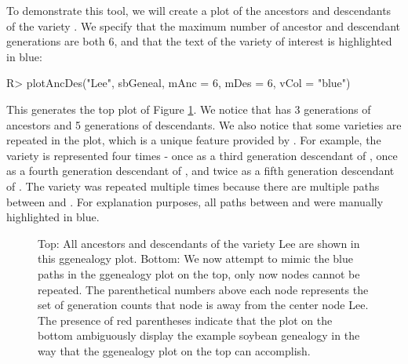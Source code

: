 \documentclass[article,shortnames]{jss}
\begin{document}
To demonstrate this tool, we will create a plot of the ancestors and descendants of the variety . We specify that the maximum number of ancestor and descendant generations are both 6, and that the text of the variety of interest is highlighted in blue:

\begin{Code}
R> plotAncDes("Lee", sbGeneal, mAnc = 6, mDes = 6, vCol = "blue")
\end{Code}

This generates the top plot of Figure \ref{fig:Lee}. We notice that  has 3 generations of ancestors and 5 generations of descendants. We also notice that some varieties are repeated in the plot, which is a unique feature provided by . For example, the variety  is represented four times - once as a third generation descendant of , once as a fourth generation descendant of , and twice as a fifth generation descendant of . The variety  was repeated multiple times because there are multiple paths between  and . For explanation purposes, all paths between  and  were manually highlighted in blue.

\begin{figure}[H]
    \centering
    \caption{Top: All ancestors and descendants of the variety Lee are shown in this ggenealogy plot. Bottom: We now attempt to mimic the blue paths in the ggenealogy plot on the top, only now nodes cannot be repeated. The parenthetical numbers above each node represents the set of generation counts that node is away from the center node Lee. The presence of red parentheses indicate that the plot on the bottom ambiguously display the example soybean genealogy in the way that the ggenealogy plot on the top can accomplish.}
    \label{fig:Lee}
\end{figure}
\end{document}
